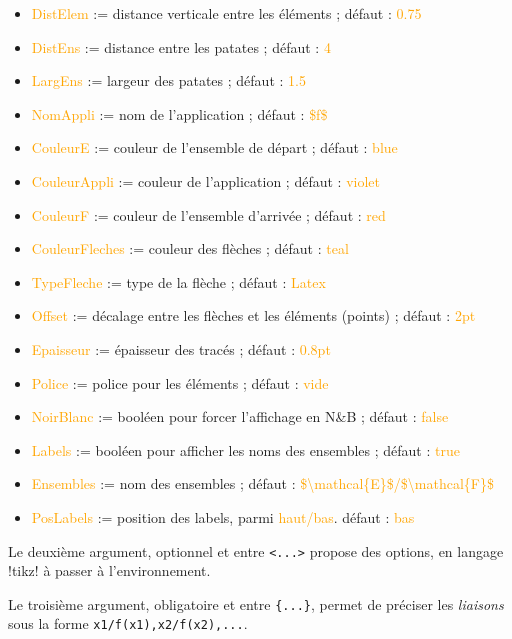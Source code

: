 \documentclass[french,a4paper,11pt]{article}
\newcommand\Cle[1]{{\small\sffamily\textlangle \textcolor{orange}{#1}\textrangle}}
\begin{document}
{{\begin{tipblock}
\begin{itemize}
	\item \Cle{DistElem} := distance verticale entre les éléments ; \hfill{}défaut : \Cle{0.75}
	\item \Cle{DistEns} := distance entre les \og patates \fg{} ; \hfill{}défaut : \Cle{4}
	\item \Cle{LargEns} := largeur des \og patates \fg{} ; \hfill{}défaut : \Cle{1.5}
	\item \Cle{NomAppli} := nom de l'application ; \hfill{}défaut : \Cle{\$f\$}
	\item \Cle{CouleurE} := couleur de l'ensemble de départ ; \hfill{}défaut : \Cle{blue}
	\item \Cle{CouleurAppli} := couleur de l'application ; \hfill{}défaut : \Cle{violet}
	\item \Cle{CouleurF} := couleur de l'ensemble d'arrivée ; \hfill{}défaut : \Cle{red}
	\item \Cle{CouleurFleches} := couleur des flèches ; \hfill{}défaut : \Cle{teal}
	\item \Cle{TypeFleche} := type de la flèche  ; \hfill{}défaut : \Cle{Latex}
	\item \Cle{Offset} := décalage entre les flèches et les éléments (points) ; \hfill{}défaut : \Cle{2pt}
	\item \Cle{Epaisseur} := épaisseur des tracés ; \hfill{}défaut : \Cle{0.8pt}
	\item \Cle{Police} := police pour les éléments ; \hfill{}défaut : \Cle{vide}
	\item \Cle{NoirBlanc} := booléen pour forcer l'affichage en N\&{}B ; \hfill{}défaut : \Cle{false}
	\item \Cle{Labels} := booléen pour afficher les noms des ensembles ; \hfill{}défaut : \Cle{true}
	\item \Cle{Ensembles} := nom des ensembles  ; \hfill{}défaut : \Cle{\$\textbackslash mathcal\{E\}\$/\$\textbackslash  mathcal\{F\}\$}
	\item \Cle{PosLabels} := position des labels, parmi \Cle{haut/bas}. \hfill{}défaut : \Cle{bas}
\end{itemize}

Le deuxième argument, optionnel et entre \texttt{<...>} propose des options, en langage \packagetex!tikz! à passer à l'environnement.

\smallskip

Le troisième argument, obligatoire et entre \texttt{\{...\}}, permet de préciser les \textit{liaisons} sous la forme \verb!x1/f(x1),x2/f(x2),...!.
\end{tipblock}

}}
\end{document}
